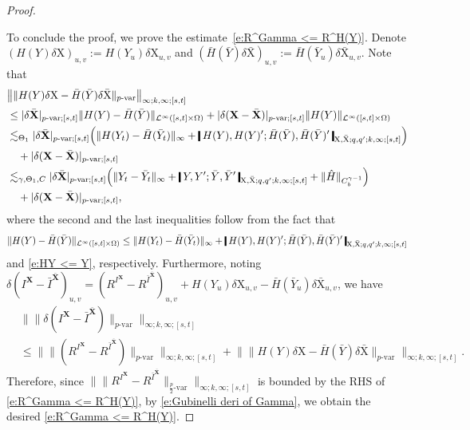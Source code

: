 \documentclass[11pt,reqno]{amsart}
\numberwithin{equation}{section}
\newcommand{\shortthickbar}{%
  \vcenter{\hbox{\rule{1.8pt}{2.2ex}}}%
}
\newcommand{\thicknm}[1]{%
  \mathopen{\shortthickbar}%
  \mkern4mu #1 \mkern4mu%
  \mathclose{\shortthickbar}%
}
\begin{document}
\begin{proof}
\

To conclude the proof, we prove the estimate~\eqref{e:R^Gamma <= R^H(Y)}. Denote $(H(Y)\delta \mathrm X)_{u,v} := H(Y_u)\delta \mathrm X_{u,v}$ and $(\bar H(\bar Y)\delta \bar{\mathrm X})_{u,v} := \bar H(\bar Y_u) \delta \bar{\mathrm X}_{u,v}$. Note that 
\begin{equation}\label{e:Gubinelli deri of Gamma}
\begin{aligned}
&\big\| \|H(Y)\delta \mathrm X - \bar H(\bar Y)\delta \bar{\mathrm X} \|_{p\text{-}\mathrm{var}} \big\|_{\infty;k,\infty;[s,t]} \\ 
&\le |\delta \bar{\mathbf X} |_{p\text{-}\mathrm{var};[s,t]} \|H(Y) - \bar H(\bar Y)\|_{\mathcal L^{\infty}([s,t] \times \Omega)} + |\delta (\mathbf X - \bar{\mathbf X}) |_{p\text{-}\mathrm{var};[s,t]} \|H(Y)\|_{\mathcal L^{\infty}([s,t] \times \Omega)} \\ 
&\lesssim_{\Theta_1} |\delta \bar{\mathbf X} |_{p\text{-}\mathrm{var};[s,t]} \Big( \|H(Y_t) - \bar H(\bar Y_t)\|_{\infty} + \thicknm{H(Y),H(Y)'; \bar H(\bar Y), \bar H(\bar Y)'}_{\mathrm X, \bar{\mathrm X};q,q';k,\infty;[s,t]} \Big)	\\
&\quad + |\delta (\mathbf X - \bar{\mathbf X}) |_{p\text{-}\mathrm{var};[s,t]} \\ 
&\lesssim_{\gamma,\Theta_1,C} |\delta \bar {\mathbf X} |_{p\text{-}\mathrm{var};[s,t]} \Big( \|Y_t - \bar Y_t\|_{\infty} + \thicknm{Y ,Y'; \bar Y, \bar Y'}_{\mathrm X,\bar{\mathrm X};q,q';k,\infty;[s,t]} + \|\hat H\|_{C^{\gamma - 1}_{b}} \Big) \\
&\quad + |\delta (\mathbf X - \bar{\mathbf X}) |_{p\text{-}\mathrm{var};[s,t]},
\end{aligned}
\end{equation}
where the second and the last inequalities follow from the fact that 
\[\|H(Y) - \bar H(\bar Y)\|_{\mathcal L^{\infty}([s,t] \times \Omega)} \le \|H(Y_t) - \bar H(\bar Y_t)\|_{\infty} + \thicknm{H(Y),H(Y)'; \bar H(\bar Y),\bar H(\bar Y)'}_{\mathrm X,\bar{\mathrm X};q,q';k,\infty;[s,t]}\]
and \eqref{e:HY <= Y}, respectively. Furthermore, noting $\delta(I^{\mathbf X} - \bar I^{\bar{\mathbf X}})_{u,v} = (R^{I^{\mathbf X}} - R^{\bar I^{\bar{\mathbf X}}})_{u,v} + H(Y_u)\delta \mathrm X_{u,v} - \bar H(\bar Y_u)\delta \bar{\mathrm X}_{u,v}$, we have  
\begin{equation*}
\begin{aligned}
&\big\| \| \delta (I^{\mathbf X} - \bar I^{\bar{\mathbf X}}) \|_{p\text{-}\mathrm{var}} \big\|_{\infty;k,\infty;[s,t]}\\ 
&\le \big\| \|(R^{I^{\mathbf X}} - R^{\bar I^{\bar{\mathbf X}}})\|_{p\text{-}\mathrm{var}} \big\|_{\infty;k,\infty;[s,t]} +  \big\| \|H(Y) \delta \mathrm X - \bar H(\bar Y) \delta \bar{\mathrm X} \|_{p\text{-}\mathrm{var}} \big\|_{\infty;k,\infty;[s,t]}. 
\end{aligned}
\end{equation*}
Therefore, since $\| \| R^{I^{\mathbf X}} - R^{\bar I^{\bar{\mathbf X}}}\|_{\frac{p}{2}\text{-}\mathrm{var}} \|_{\infty;k,\infty;[s,t]}$ is bounded by the RHS of \eqref{e:R^Gamma <= R^H(Y)}, by  \eqref{e:Gubinelli deri of Gamma}, we obtain the desired \eqref{e:R^Gamma <= R^H(Y)}. 
\end{proof}
\end{document}
